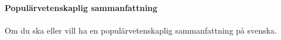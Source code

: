 \null\vfill

{\Huge \textbf{Populärvetenskaplig sammanfattning}} \\ \\

Om du ska eller vill ha en populärvetenskaplig sammanfattning på svenska.

\vfill\vfill\vfill\vfill\null